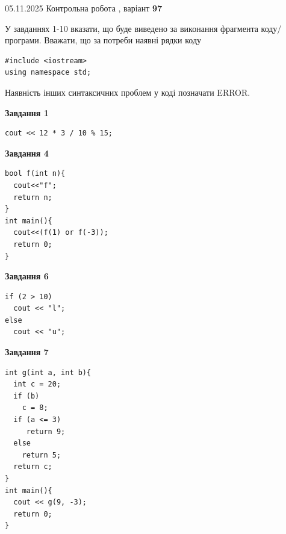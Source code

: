\documentclass[12pt, ukrainian]{article}
\begin{document}
{\Large{05.11.2025 Контрольна робота , варіант  \No \textbf { 97 }\par}}
{
\begin {large}
У завданнях 1-10 вказати, що буде виведено за виконання фрагмента коду/про\-гра\-ми.
Вважати, що за потреби наявні рядки коду
\begin{verbatim}
#include <iostream>
using namespace std;
\end{verbatim}
Наявність інших синтаксичних проблем у коді позначати ERROR.

\begin{minipage}[t]{7.0cm}

\begin{center}
\textbf{Завдання 1}
\end{center}
\vspace{-8mm}

\begin{verbatim}
cout << 12 * 3 / 10 % 15;
\end{verbatim}



\begin{center}
\textbf{Завдання 4}
\end{center}
\vspace{-8mm}

\begin{verbatim}
bool f(int n){
  cout<<"f";
  return n;
}
int main(){
  cout<<(f(1) or f(-3));
  return 0;
}
\end{verbatim}



\begin{center}
\textbf{Завдання 6}
\end{center}
\vspace{-8mm}

\begin{verbatim}
if (2 > 10)
  cout << "l";
else
  cout << "u";
\end{verbatim}



\begin{center}
\textbf{Завдання 7}
\end{center}
\vspace{-8mm}

\begin{verbatim}
int g(int a, int b){
  int c = 20;
  if (b)
    c = 8;
  if (a <= 3)
     return 9;
  else
    return 5;
  return c;
}
int main(){
  cout << g(9, -3);
  return 0;
}
\end{verbatim}


\end{minipage}
\end{large}}
\end{document}
